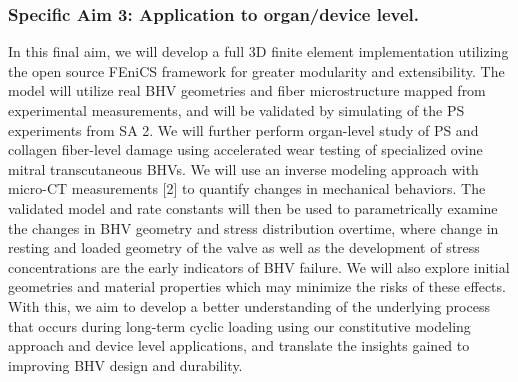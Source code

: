     
    
    \subsubsection*{Specific Aim 3: Application to organ/device level.} In this final aim, we will develop a full 3D finite element implementation utilizing the open source FEniCS framework for greater modularity and extensibility. The model will utilize real BHV geometries and fiber microstructure mapped from experimental measurements, and will be validated by simulating of the PS experiments from SA 2. We will further perform organ-level study of PS and collagen fiber-level damage using accelerated wear testing of specialized ovine mitral transcutaneous BHVs. We will use an inverse modeling approach with micro-CT measurements [2] to quantify changes in mechanical behaviors. The validated model and rate constants will then be used to parametrically examine the changes in BHV geometry and stress distribution overtime, where change in resting and loaded geometry of the valve as well as the development of stress concentrations are the early indicators of BHV failure. We will also explore initial geometries and material properties which may minimize the risks of these effects. With this, we aim to develop a better understanding of the underlying process that occurs during long-term cyclic loading using our constitutive modeling approach and device level applications, and translate the insights gained to improving BHV design and durability. 

